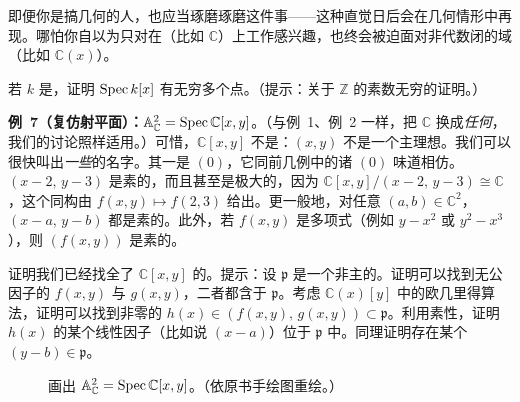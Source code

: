 即便你是搞几何的人，也应当琢磨琢磨这件事——这种直觉日后会在几何情形中再现。哪怕你自以为只对在\trAlgClosedField{}（比如 $\mathbb{C}$）上工作感兴趣，也终会被迫面对非代数闭的域（比如 $\mathbb{C}(x)$）。

\begin{exercise}\label{ex:spec-kx-infinite}
若 $k$ 是\trField，证明 $\operatorname{Spec} k[x]$ 有无穷多个点。（提示：关于 $\mathbb{Z}$ 的素数无穷的证明。）
\end{exercise}

\textbf{例~7（复仿射平面）：}$\mathbb{A}^2_{\mathbb{C}}=\operatorname{Spec}\mathbb{C}[x,y]$。（与例~1、例~2 一样，把 $\mathbb{C}$ 换成\emph{任何}\trAlgClosedField，我们的讨论照样适用。）可惜，$\mathbb{C}[x,y]$ 不是\trPID：$(x,y)$ 不是一个主理想。我们可以很快叫出\emph{一些}\trPrimeIdeal{}的名字。其一是 $(0)$，它同前几例中的诸 $(0)$ 味道相仿。$(x-2,\,y-3)$ 是素的，而且甚至是极大的，因为 $\mathbb{C}[x,y]/(x-2,\,y-3)\cong\mathbb{C}$，这个同构由 $f(x,y)\mapsto f(2,3)$ 给出。更一般地，对任意 $(a,b)\in\mathbb{C}^2$，$(x-a,\,y-b)$ 都是素的。此外，若 $f(x,y)$ 是\trIrreducible{}多项式（例如 $y-x^2$ 或 $y^2-x^3$），则 $(f(x,y))$ 是素的。

\begin{exercise}\label{ex:prime-ideals-cxy}
证明我们已经找全了 $\mathbb{C}[x,y]$ 的\trPrimeIdeal。提示：设 $\mathfrak{p}$ 是一个非主的\trPrimeIdeal。证明可以找到无公因子的 $f(x,y)$ 与 $g(x,y)$，二者都含于 $\mathfrak{p}$。考虑\trEuclideanDomain{} $\mathbb{C}(x)[y]$ 中的欧几里得算法，证明可以找到非零的 $h(x)\in(f(x,y),\,g(x,y))\subset\mathfrak{p}$。利用素性，证明 $h(x)$ 的某个线性因子（比如说 $(x-a)$）位于 $\mathfrak{p}$ 中。同理证明存在某个 $(y-b)\in\mathfrak{p}$。
\end{exercise}

\begin{figure}[htbp]
\centering
{}
\caption{画出 $\mathbb{A}^2_{\mathbb{C}}=\operatorname{Spec}\mathbb{C}[x,y]$。（依原书手绘图重绘。）}\label{fig:a2c-picture}
\end{figure}

